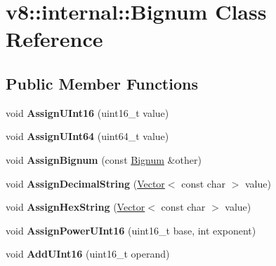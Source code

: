\hypertarget{classv8_1_1internal_1_1_bignum}{}\section{v8\+:\+:internal\+:\+:Bignum Class Reference}
\label{classv8_1_1internal_1_1_bignum}
\subsection*{Public Member Functions}
\begin{DoxyCompactItemize}
\item 
void {\bfseries Assign\+U\+Int16} (uint16\+\_\+t value)\hypertarget{classv8_1_1internal_1_1_bignum_a4494bf1b9c7019cbf4e4f68e5db6530f}{}\label{classv8_1_1internal_1_1_bignum_a4494bf1b9c7019cbf4e4f68e5db6530f}

\item 
void {\bfseries Assign\+U\+Int64} (uint64\+\_\+t value)\hypertarget{classv8_1_1internal_1_1_bignum_aa6b480a8b87a4d88f12c70e5e5e29cc9}{}\label{classv8_1_1internal_1_1_bignum_aa6b480a8b87a4d88f12c70e5e5e29cc9}

\item 
void {\bfseries Assign\+Bignum} (const \hyperlink{classv8_1_1internal_1_1_bignum}{Bignum} \&other)\hypertarget{classv8_1_1internal_1_1_bignum_a579dd1d065e3dd01c596b230c150b6b0}{}\label{classv8_1_1internal_1_1_bignum_a579dd1d065e3dd01c596b230c150b6b0}

\item 
void {\bfseries Assign\+Decimal\+String} (\hyperlink{classv8_1_1internal_1_1_vector}{Vector}$<$ const char $>$ value)\hypertarget{classv8_1_1internal_1_1_bignum_a7815f04f794492a92c30a495e1a1f9ab}{}\label{classv8_1_1internal_1_1_bignum_a7815f04f794492a92c30a495e1a1f9ab}

\item 
void {\bfseries Assign\+Hex\+String} (\hyperlink{classv8_1_1internal_1_1_vector}{Vector}$<$ const char $>$ value)\hypertarget{classv8_1_1internal_1_1_bignum_a6768408361ec5bf75c6be7bfc06de11a}{}\label{classv8_1_1internal_1_1_bignum_a6768408361ec5bf75c6be7bfc06de11a}

\item 
void {\bfseries Assign\+Power\+U\+Int16} (uint16\+\_\+t base, int exponent)\hypertarget{classv8_1_1internal_1_1_bignum_a780344bc5af94ce23ad33cd2a7a9d497}{}\label{classv8_1_1internal_1_1_bignum_a780344bc5af94ce23ad33cd2a7a9d497}

\item 
void {\bfseries Add\+U\+Int16} (uint16\+\_\+t operand)\hypertarget{classv8_1_1internal_1_1_bignum_ac7ff62980b1599577a60d292076fd0df}{}\label{classv8_1_1internal_1_1_bignum_ac7ff62980b1599577a60d292076fd0df}


\end{DoxyCompactItemize}

